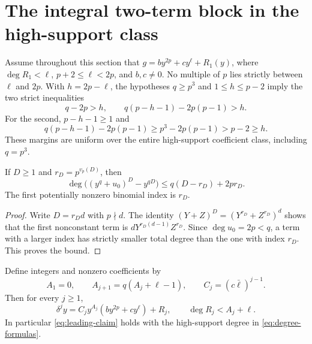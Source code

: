 \section{The integral two-term block in the high-support class}\label{sec:high}

Assume throughout this section that $g=by^{2p}+cy^\ell+R_1(y)$,
where $\deg R_1<\ell$, $p+2\le\ell<2p$, and $b,c\ne0$.
No multiple of $p$ lies strictly between $\ell$ and $2p$.
With $h=2p-\ell$, the hypotheses $q\ge p^3$ and $1\le h\le p-2$
imply the two strict inequalities
\begin{equation}\label{eq:strict-gaps}
 q-2p>h,\qquad
 q(p-h-1)-2p(p-1)>h.
\end{equation}
For the second, $p-h-1\ge1$ and
\[
 q(p-h-1)-2p(p-1)
 \ge p^3-2p(p-1)>p-2\ge h.
\]
These margins are uniform over the entire high-support coefficient
class, including $q=p^3$.

\begin{lemma}\label{lem:binomial}
If $D\ge1$ and $r_D=p^{v_p(D)}$, then
\begin{equation}\label{eq:binomial-bound}
 \deg\bigl((y^q+u_0)^D-y^{qD}\bigr)
 \le q(D-r_D)+2p r_D.
\end{equation}
The first potentially nonzero binomial index is $r_D$.
\end{lemma}
\begin{proof}
Write $D=r_D d$ with $p\nmid d$. The identity
$(Y+Z)^D=(Y^{r_D}+Z^{r_D})^d$ shows that the first nonconstant
term is $dY^{r_D(d-1)}Z^{r_D}$. Since $\deg u_0=2p<q$, a term
with a larger index has strictly smaller total degree than the
one with index $r_D$. This proves the bound.
\end{proof}

\begin{proposition}\label{prop:high}
Define integers and nonzero coefficients by
\[
 A_1=0,\qquad A_{j+1}=q(A_j+\ell-1),\qquad
 C_j=(c\bar\ell)^{j-1}.
\]
Then for every $j\ge1$,
\begin{equation}\label{eq:high-invariant}
 \delta^j y=C_jy^{A_j}(by^{2p}+cy^\ell)+R_j,
 \qquad \deg R_j<A_j+\ell.
\end{equation}
In particular \eqref{eq:leading-claim} holds with the high-support
degree in \eqref{eq:degree-formulas}.
\end{proposition}

